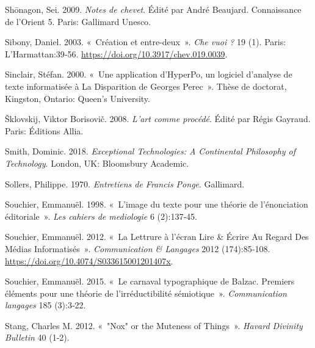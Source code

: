 \begin{CSLReferences}{1}{0}
\leavevmode{}%
Shōnagon, Sei. 2009. \emph{{Notes de chevet}}. Édité par André Beaujard.
{Connaissance de l'Orient} 5. {Paris}: {Gallimard Unesco}.

\leavevmode{}%
Sibony, Daniel. 2003. {«~{Cr{é}ation et entre-deux}~»}. \emph{Che vuoi
?} 19 (1). {Paris}: {L'Harmattan}:39‑56.
\url{https://doi.org/10.3917/chev.019.0039}.

\leavevmode{}%
Sinclair, Stéfan. 2000. {«~{Une application d'HyperPo, un logiciel
d'analyse de texte informatis{é}e {à} La Disparition de Georges
Perec}~»}. Thèse de doctorat, {Kingston, Ontario}: Queen's University.

\leavevmode{}%
Šklovskij, Viktor Borisovič. 2008. \emph{{L'art comme proc{é}d{é}}}.
Édité par Régis Gayraud. {Paris}: {{É}ditions Allia}.

\leavevmode{}%
Smith, Dominic. 2018. \emph{Exceptional {Technologies}: {A Continental
Philosophy} of {Technology}}. {London, UK}: {Bloomsbury Academic}.

\leavevmode{}%
Sollers, Philippe. 1970. \emph{{Entretiens de Francis Ponge}}.
{Gallimard}.

\leavevmode{}%
Souchier, Emmanuël. 1998. {«~{L'image du texte pour une th{é}orie de
l'{é}nonciation {é}ditoriale}~»}. \emph{Les cahiers de mediologie} 6
(2):137‑45.

\leavevmode{}%
Souchier, Emmanuël. 2012. {«~La {\guillemotleft} Lettrure
{\guillemotright} {à} l'{é}cran {Lire} \& {É}crire Au Regard Des
M{é}dias Informatis{é}s~»}. \emph{Communication \& Langages} 2012
(174):85‑108. \url{https://doi.org/10.4074/S033615001201407x}.

\leavevmode{}%
Souchier, Emmanuël. 2015. {«~{Le carnaval typographique de Balzac.
Premiers {é}l{é}ments pour une th{é}orie de l'irr{é}ductibilit{é}
s{é}miotique}~»}. \emph{Communication langages} 185 (3):3‑22.

\leavevmode{}%
Stang, Charles M. 2012. {«~"{Nox}" or the {Muteness} of {Things}~»}.
\emph{Havard Divinity Bulletin} 40 (1-2).


\end{CSLReferences}
